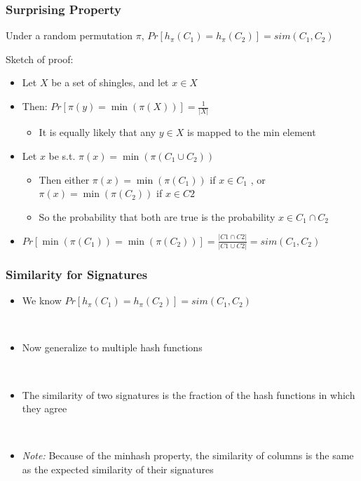 \documentclass[svgnames]{beamer}
\begin{document}
\begin{frame} \frametitle{Surprising Property}

Under a random permutation $\pi$, $Pr[h_\pi(C_1) = h_\pi(C_2)] = sim(C_1, C_2)$

\begin{block}{Sketch of proof:}
\begin{itemize}
\item Let $X$ be a set of shingles, and let $x \in X$
\item Then: $Pr[\pi(y) = \min(\pi(X))] = \frac{1}{|X|}$
\begin{itemize}
\item It is equally likely that any $y \in X$ is mapped to the min element
\end{itemize}
\item Let $x$ be s.t. $\pi(x) = \min(\pi(C_1 \cup C_2))$
\begin{itemize}
\item Then either $\pi(x) = \min(\pi(C_1))$ if $x \in C_1$ , or $\pi(x) = \min(\pi(C_2))$ if $x \in C2$
\item So the probability that both are true is the probability $x \in C_1 \cap C_2$
\end{itemize}
\item $Pr[\min(\pi(C_1))=\min(\pi(C_2))]=\frac{|C1 \cap C2|}{|C1 \cup C2|}= sim(C_1,C_2)$
\end{itemize}
\end{block}{}
\end{frame}

  
\begin{frame} \frametitle{Similarity for Signatures}

\begin{itemize}
\item We know $Pr[h_\pi(C_1) = h_\pi(C_2)] = sim(C_1, C_2)$

~\\

\item Now generalize to multiple hash functions

~\\

\item The similarity of two signatures is the fraction of the hash functions in which they agree

~\\

\item \emph{Note:} Because of the minhash property, the similarity of columns is the same as the expected similarity of their signatures
\end{itemize}
\end{frame}
\end{document}
